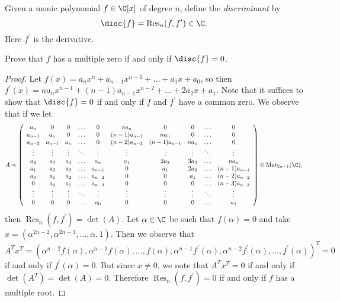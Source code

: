 \documentclass[10pt]{amsart}
\begin{document}
\begin{thm}
  Given a monic polynomial $f \in \C[x]$ of degree $n$, define the {\it discriminant} by
  $$\disc{f} = \operatorname{Res}_n(f, f^\prime) \in \C.$$
  Here $f^\prime$ is the derivative.
  
  Prove that $f$ has a multiple zero if and only if $\disc{f} = 0$.
  \begin{proof}
    Let $f(x) = a_n x^n + a_{n-1}x^{n-1} + \ldots + a_1 x + a_0$, so then $f^\prime(x) = n a_n x^{n-1} + (n-1)a_{n-1} x^{n-2} + \ldots + 2a_2 x + a_1$.
    Note that it suffices to show that $\disc{f} = 0$ if and only if $f$ and $f^\prime$ have a common zero.
    We observe that if we let 
    $$A = \left(
    \begin{array}{cccccccccc}
      a_n & 0 & 0 & \ldots & 0 & n a_n & 0 & 0 & \ldots & 0\\
      a_{n-1} & a_n & 0 & \ldots & 0 & (n-1) a_{n-1} & na_n & 0 & \ldots & 0\\
      a_{n-2} & a_{n-1} & a_n & \ldots & 0 & (n-2) a_{n-2} & (n-1)a_{n-1} & na_n & \ldots & 0\\
      \vdots & \vdots & \vdots & \ddots & \vdots & \vdots & \vdots & \vdots & \ddots & \vdots\\
      a_2 & a_3 & a_4 & \ldots & a_n & a_1 & 2a_2 & 3a_3 & \ldots & na_n\\
      a_1 & a_2 & a_3 & \ldots & a_{n-1} & 0 & a_1 & 2a_2 & \ldots & (n-1)a_{n-1}\\
      a_0 & a_1 & a_2 & \ldots & a_{n-2} & 0 & 0 & a_1 & \ldots & (n-2)a_{n-2}\\
      0 & a_0 & a_1 & \ldots & a_{n-3} & 0 & 0 & 0 & \ldots & (n-3)a_{n-3}\\
      \vdots & \vdots & \vdots & \ddots & \vdots & \vdots & \vdots & \vdots & \ddots & \vdots\\
      0 & 0 & 0 & \ldots & a_0 & 0 & 0 & 0 & \ldots & a_1\\
    \end{array}
    \right) \in \operatorname{Mat}_{2n - 1}(\C),$$
    then $\operatorname{Res}_n(f,f^\prime) = \det(A)$.
    Let $\alpha \in \C$ be such that $f(\alpha) = 0$ and take $x = (\alpha^{2n-2}, \alpha^{2n-3}, \ldots, \alpha, 1)$.
    Then we observe that 
    $$A^Tx^T = (\alpha^{n-2}f(\alpha), \alpha^{n-1}f(\alpha), \ldots, f(\alpha), \alpha^{n-1}f^\prime(\alpha), \alpha^{n-2}f^\prime(\alpha), \ldots, f^\prime(\alpha))^T = 0$$
    if and only if $f^\prime(\alpha) = 0$.
    But since $x \neq 0$, we note that $A^Tx^T = 0$ if and only if $\det(A^T) = \det(A) = 0$.
    Therefore $\operatorname{Res}_n(f,f^\prime) = 0$ if and only if $f$ has a multiple root.
  \end{proof}
\end{thm}
\end{document}
